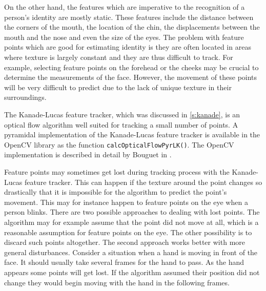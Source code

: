 \documentclass[11pt,a4paper]{report}
\begin{document}
On the other hand, the features which are imperative to the recognition of a
person's identity are mostly static. These features include the distance between the
corners of the mouth, the location of the chin, the displacements between
the mouth and the nose and even the size of the eyes. The problem with feature
points which are good for estimating identity is they are often located in areas
where texture is largely constant and they are thus difficult to track. For example, selecting
feature points on the forehead or the cheeks may be crucial to determine the
measurements of the face. However, the movement of these points will be very
difficult to predict due to the lack of unique texture in their surroundings.

The Kanade-Lucas feature tracker, which was discussed in \ref{s:kanade}, is an
optical flow algorithm well suited for tracking a small number of points. A
pyramidal implementation of the Kanade-Lucas feature tracker is available in the
OpenCV library as the function \texttt{calcOpticalFlowPyrLK()}. The OpenCV
implementation is described in detail by Bouguet in \cite{kanade4}.  

Feature points may sometimes get lost during tracking process with the Kanade-Lucas
feature tracker. This can happen if the
texture around the point changes so drastically that it is impossible for the
algorithm to predict the point's movement. This may for instance happen to feature points
on the eye when a person blinks. There are two possible approaches to dealing
with lost points. The algorithm may for example assume that the point did not move at
all, which is a reasonable assumption for feature points on the eye. The other
possibility is to discard such points altogether. The second approach works
better with more general disturbances. Consider a situation when a hand is moving
in front of the face. It should usually take several frames for the hand to
pass. As the hand appears some points will get lost. If the algorithm assumed
their position did not change they would begin moving with the hand in the
following frames.
\end{document}
